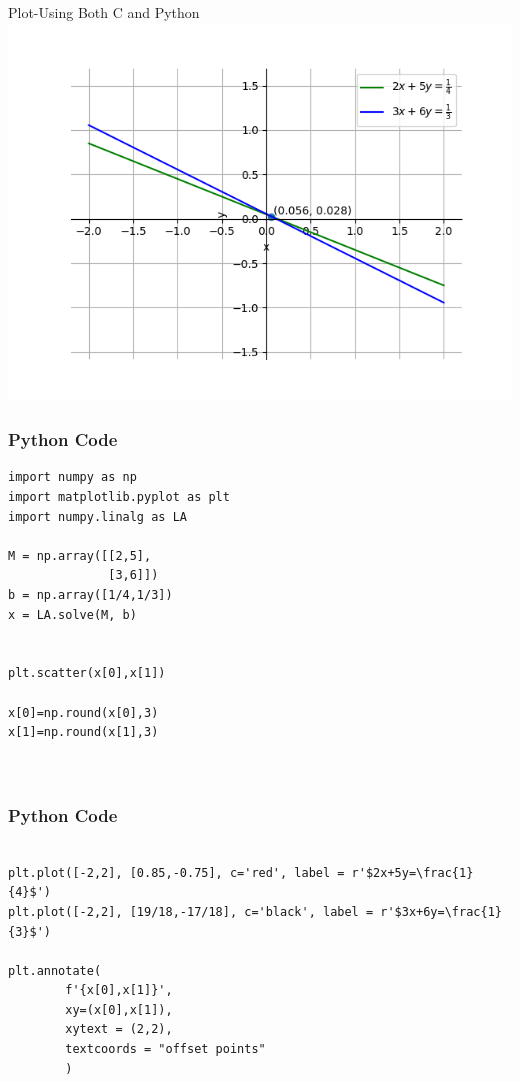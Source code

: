 \documentclass{beamer}
\begin{document}
\begin{frame}{Plot-Using Both C and Python}
    \centering
    \includegraphics[width=\columnwidth, height=0.8\textheight, keepaspectratio]{Figs/plot(py+C).png}     
\end{frame}



\begin{frame}[fragile]
    \frametitle{Python Code}
    \begin{lstlisting}
import numpy as np
import matplotlib.pyplot as plt
import numpy.linalg as LA

M = np.array([[2,5],
              [3,6]])
b = np.array([1/4,1/3])
x = LA.solve(M, b)


plt.scatter(x[0],x[1])

x[0]=np.round(x[0],3)
x[1]=np.round(x[1],3)



\end{lstlisting}
\end{frame}

\begin{frame}[fragile]
    \frametitle{Python Code}
    \begin{lstlisting}

plt.plot([-2,2], [0.85,-0.75], c='red', label = r'$2x+5y=\frac{1}{4}$')
plt.plot([-2,2], [19/18,-17/18], c='black', label = r'$3x+6y=\frac{1}{3}$')

plt.annotate(
        f'{x[0],x[1]}',
        xy=(x[0],x[1]),
        xytext = (2,2),
        textcoords = "offset points"
        )


\end{lstlisting}
\end{frame}
\end{document}

